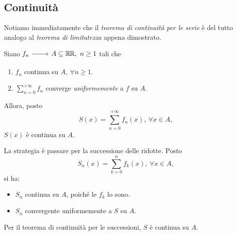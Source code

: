 \subsection{Continuità}
Notiamo immediatamente che il \textit{teorema di continuità per le serie} è del tutto analogo al \textit{teorema di limitatezza} appena dimostrato.
\begin{theorema}
	Siano $\funz{f_n}{A\subseteq\realset}{\realset},\ n\geq 1$ tali che
	\begin{enumerate}[label=\alph*.]
		\item $f_n$ continua su $A,\ \forall n\geq 1$.
		\item $\displaystyle\sum_{n=0}^{+\infty}f_n$ converge \textit{uniformemente} a $f$ su $A$.
	\end{enumerate}
	Allora, posto
	\begin{equation*}
		S(x)=\sum_{n=0}^{+\infty}f_n(x),\ \forall x\in A,
	\end{equation*}
	$S(x)$ è continua su $A$.
\end{theorema}
\begin{demonstration}
	La strategia è passare per la successione delle ridotte.
	Posto
	\begin{equation*}
		S_n(x)=\sum_{k=0}^{n}f_k(x),\ \forall x\in A,
	\end{equation*}
	si ha:
	\begin{itemize}
		\item $S_n$ continua su $A$, poiché le $f_k$ lo sono.
		\item $S_n$ convergente uniformemente a $S$ su $A$.
	\end{itemize}
	Per il teorema di continuità per le successioni, $S$ è continua su $A$.
\end{demonstration}
